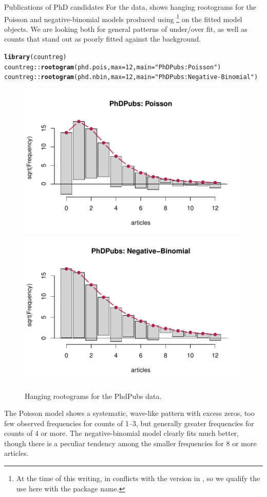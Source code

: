 \documentclass[11pt]{book}\usepackage[]{graphicx}\usepackage[]{color}
\makeatletter
\newcommand{\hlnum}[1]{\textcolor[rgb]{0.686,0.059,0.569}{#1}}%
\newcommand{\hlstr}[1]{\textcolor[rgb]{0.192,0.494,0.8}{#1}}%
\newcommand{\hlstd}[1]{\textcolor[rgb]{0.345,0.345,0.345}{#1}}%
\newcommand{\hlkwc}[1]{\textcolor[rgb]{0.333,0.667,0.333}{#1}}%
\newcommand{\hlkwd}[1]{\textcolor[rgb]{0.737,0.353,0.396}{\textbf{#1}}}%
\newenvironment{kframe}{%
 \def\at@end@of@kframe{}%
 \ifinner\ifhmode%
  \def\at@end@of@kframe{\end{minipage}}%
  \begin{minipage}{\columnwidth}%
 \fi\fi%
 \def\FrameCommand##1{\hskip\@totalleftmargin \hskip-\fboxsep
 \colorbox{shadecolor}{##1}\hskip-\fboxsep
     \hskip-\linewidth \hskip-\@totalleftmargin \hskip\columnwidth}%
 \MakeFramed {\advance\hsize-\width
   \@totalleftmargin\z@ \linewidth\hsize
   \@setminipage}}%
 {\par\unskip\endMakeFramed%
 \at@end@of@kframe}
\newenvironment{knitrout}{}{} %
\renewenvironment{knitrout}{\small\renewcommand{\baselinestretch}{.85}}{} %
\makeatother
\begin{document}
\begin{Example}[phdpubs4]{Publications of PhD candidates}
For the  data,  shows hanging rootograms for the
Poisson and negative-binomial models produced using %
\footnote{
At the time of this writing,  in  conflicts with
the version in , so we qualify the use here with the package name.
}
on the fitted model objects.  We are looking both for general patterns of under/over fit, as well
as counts that stand out as poorly fitted against the background.

\begin{knitrout}
\color{fgcolor}\begin{kframe}
\begin{alltt}
\hlkwd{library}\hlstd{(countreg)}
\hlstd{countreg::}\hlkwd{rootogram}\hlstd{(phd.pois,} \hlkwc{max}\hlstd{=}\hlnum{12}\hlstd{,} \hlkwc{main}\hlstd{=}\hlstr{"PhDPubs: Poisson"}\hlstd{)}
\hlstd{countreg::}\hlkwd{rootogram}\hlstd{(phd.nbin,} \hlkwc{max}\hlstd{=}\hlnum{12}\hlstd{,} \hlkwc{main}\hlstd{=}\hlstr{"PhDPubs: Negative-Binomial"}\hlstd{)}
\end{alltt}
\end{kframe}\begin{figure}[!htbp]


\centerline{\includegraphics[width=.49\textwidth]{ch09/fig/phdpubs4-rootogram-1} 
\includegraphics[width=.49\textwidth]{ch09/fig/phdpubs4-rootogram-2} }

\caption[Hanging rootograms for the PhdPubs data]{Hanging rootograms for the PhdPubs data.\label{fig:phdpubs4-rootogram}}
\end{figure}


\end{knitrout}
The Poisson model shows a systematic, wave-like pattern with excess zeros, too few observed frequencies for
counts of
1--3, but generally greater frequencies for counts of 4 or more.  The negative-binomial model
clearly fits much better, though there is a peculiar tendency among the smaller
frequencies for 8 or more articles.
\end{Example}
\end{document}

